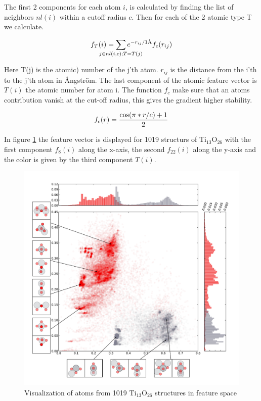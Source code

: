 \documentclass[%
 aps,
 prl,%
 amsmath,amssymb,
 reprint,%
]{revtex4-1}
\begin{document}
The first 2 components for each atom $i$, is calculated by finding the list of neighbors $nl(i)$ within a cutoff radius $c$. Then for each of the 2 atomic type T we calculate. 

\begin{equation}
f_T(i) = \sum_{\mathclap{j \in nl(i,c);T=T(j)}} e^{-r_{ij}/1\text{\AA}}f_c(r_{ij})  \label{eq1}
\end{equation}

Here T(j) is the atomic) number of the j'th atom. $r_{ij}$ is the distance from the i'th to the j'th atom in {\AA}ngstr\"{o}m. The last component of the atomic feature vector is $T(i)$ the atomic number for atom i. 
The function $f_c$ make sure that an atoms contribution vanish at the cut-off radius, this gives the gradient higher stability.

\begin{equation}
f_c(r)={{\cos(\pi*r/c)+1}\over 2}
\end{equation}



In figure \ref{fig:fig1} the feature vector is displayed for 1019 structurs of Ti$_{13}$O$_{26}$ with the first component $f_8(i)$ along the x-axis, the second $f_{22}(i)$ along the y-axis and the color is given by the third component $T(i)$. 


\begin{figure}[h]
    \centering
    \includegraphics[width=1.0\columnwidth]{ascatter_1_Ti13O26Ridge_1510747669.pdf}
    \caption{Visualization of atoms from 1019 Ti$_{13}$O$_{26}$ structures in feature space}
    \label{fig:fig1}
\end{figure}
\end{document}
